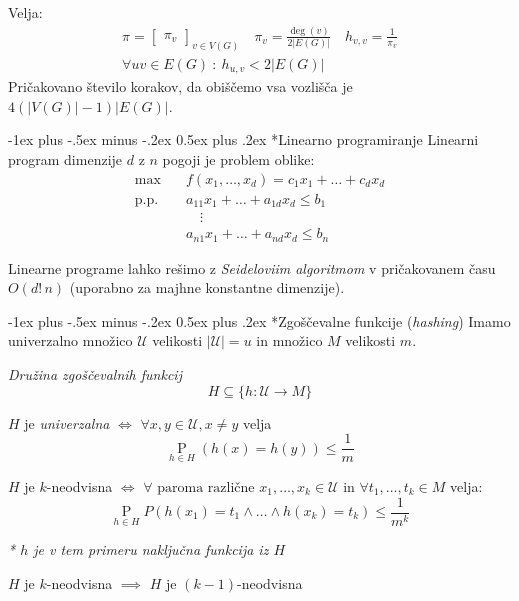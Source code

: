 \documentclass[a3paper,8pt]{extarticle}
\makeatletter
\renewcommand{\section}{\@startsection{section}{1}{0mm}%
                                {-1ex plus -.5ex minus -.2ex}%
                                {0.5ex plus .2ex}%
                                {\normalfont\large\bfseries}}
\makeatother
\begin{document}
\begin{multicols}{4}
Velja:
\begin{gather*}
    \pi = \begin{bmatrix}
        \pi_v
    \end{bmatrix}_{v \in V(G)} \quad
    \pi_v = \frac{\deg(v)}{2|E(G)|}  \quad
    h_{v,v} = \frac{1}{\pi_v} \\
    \forall uv \in E(G)\ :\ h_{u,v} < 2|E(G)|
\end{gather*}
Pričakovano število korakov, da obiščemo vsa vozlišča je $4(|V(G)|-1)|E(G)|$.

\section*{Linearno programiranje}
Linearni program dimenzije $d$ z $n$ pogoji je problem oblike:
\begin{align*}
    \text{max}\quad & f(x_1, \dots, x_d) = c_1 x_1 + \dots + c_d x_d \\
    \text{p.p.} \quad & a_{11} x_1 + \dots + a_{1d} x_d \leq b_1 \\
         & \quad \vdots  \\
        & a_{n1} x_1 + \dots + a_{nd} x_d \leq b_n 
\end{align*}

Linearne programe lahko rešimo z \textit{Seideloviim algoritmom} v pričakovanem času $O(d!\, n)$ (uporabno za majhne konstantne dimenzije).


\section*{Zgoščevalne funkcije (\textit{hashing})}
Imamo univerzalno množico $\mathcal{U}$ velikosti $|\mathcal{U}| = u$ in množico $M$ velikosti $m$. 

\textit{Družina zgoščevalnih funkcij}
\[ H \subseteq \{h: \mathcal{U} \to M \}\]

$H$ je \textit{univerzalna} $\iff$ $\forall x, y \in \mathcal{U}, x \neq y$ velja
\[ \mathop{P}\limits_{h\in H} (h(x) = h(y)) \leq \frac{1}{m} \]

$H$ je $k$-neodvisna $\iff$ $\forall \text{ paroma različne } x_1, \dots, x_k \in \mathcal{U}$ in $\forall t_1, \dots, t_k \in M$ velja:
\[ \mathop{P}\limits_{h\in H} P(h(x_1) = t_1 \wedge \dots \wedge h(x_k) = t_k) \leq \frac{1}{m^k}\]

\textit{* $h$ je v tem primeru naključna funkcija iz $H$}

$H$ je $k$-neodvisna $\implies$ $H$ je $(k-1)$-neodvisna




\end{multicols}
\end{document}
